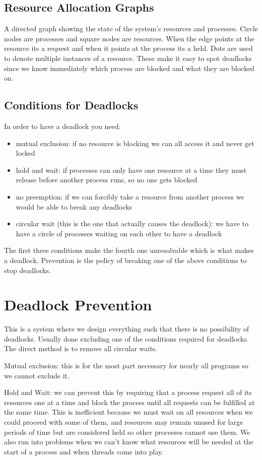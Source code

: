 \documentclass[12pt]{article}
\begin{document}
\subsection{Resource Allocation Graphs}
A directed graph showing the state of the system's resources and processes. Circle nodes are processes and square nodes are resources. When the edge points at the resource its a request and when it points at the process its a held. Dots are used to denote multiple instances of a resource. These make it easy to spot deadlocks since we know immediately which process are blocked and what they are blocked on.


\subsection{Conditions for Deadlocks}
In order to have a deadlock you need:
\begin{itemize}
  \item mutual exclusion: if no resource is blocking we can all access it and never get locked
  \item hold and wait: if processes can only have one resource at a time they must release before another process runs, so no one gets blocked
  \item no preemption: if we can forcibly take a resource from another process we would be able to break any deadlocks
  \item circular wait (this is the one that actually causes the deadlock): we have to have a circle of processes waiting on each other to have a deadlock
\end{itemize}

The first three conditions make the fourth one unresolvable which is what makes a deadlock. Prevention is the policy of breaking one of the above conditions to stop deadlocks.

\section{Deadlock Prevention}
This is a system where we design everything such that there is no possibility of deadlocks. Usually done excluding one of the conditions required for deadlocks. The direct method is to remove all circular waits.

Mutual exclusion: this is for the most part necessary for nearly all programs so we cannot exclude it.

Hold and Wait: we can prevent this by requiring that a process request all of its resources one at a time and block the process until all requests can be fulfilled at the same time. This is inefficient because we must wait on all resources when we could proceed with some of them, and resources may remain unused for large periods of time but are considered held so other processes cannot use them. We also run into problems when we can't know what resources will be needed at the start of a process and when threads come into play.
\end{document}
